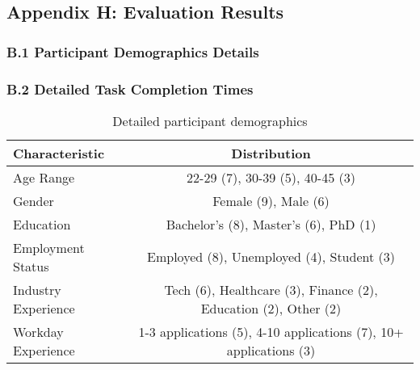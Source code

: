 \documentclass[
	letterpaper, %
]{jdf}
\begin{document}
\begin{sloppypar}
\hfill \break

\subsection{Appendix H: Evaluation Results}
\subsubsection{B.1 Participant Demographics Details}
\subsubsection{B.2 Detailed Task Completion Times}


\begin{table}[h]
\centering
\begin{tabular}{|l|c|}
\hline
\textbf{Characteristic} & \textbf{Distribution} \\
\hline
Age Range & 22-29 (7), 30-39 (5), 40-45 (3) \\
\hline
Gender & Female (9), Male (6) \\
\hline
Education & Bachelor's (8), Master's (6), PhD (1) \\
\hline
Employment Status & Employed (8), Unemployed (4), Student (3) \\
\hline
Industry Experience & Tech (6), Healthcare (3), Finance (2), Education (2), Other (2) \\
\hline
Workday Experience & 1-3 applications (5), 4-10 applications (7), 10+ applications (3) \\
\hline
\end{tabular}
\caption{Detailed participant demographics}
\end{table}




\end{sloppypar}
\end{document}
